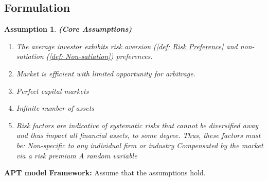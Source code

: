 \documentclass[13pt]{article}
\newtheorem{assumption}[theorem]{Assumption}
\theoremstyle{definition}
\theoremstyle{remark}
\begin{document}
\subsection{Formulation}
\begin{assumption}
    \textbf{(Core Assumptions)}\begin{enumerate}
        \item The average investor exhibits risk aversion  (\cref{def: Risk Preference} and non-satiation (\cref{def: Non-satiation}) preferences.
        \item Market is efficient with limited opportunity for arbitrage.
        \item Perfect capital markets
        \item Infinite number of assets
        \item Risk factors are indicative of systematic risks that cannot be diversified away and thus impact all financial assets, to some degree. Thus, these factors must be:    
Non-specific to any individual firm or industry
Compensated by the market via a risk premium
A random variable  
    \end{enumerate}
\end{assumption}
{\color{C6}\textbf{APT model Framework:}} Assume that the assumptions hold.
\end{document}
